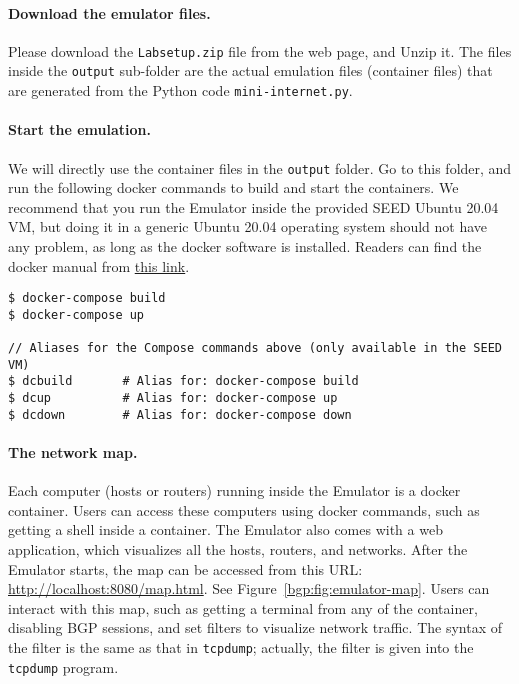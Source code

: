 \paragraph{Download the emulator files.}
Please download the \texttt{Labsetup.zip} file from the web page, and 
Unzip it. The files inside the \texttt{output} sub-folder are the actual
emulation files (container files) that are
generated from the Python code \texttt{mini-internet.py}.


\paragraph{Start the emulation.}
We will directly use the container files in the \texttt{output} folder. 
Go to this folder, and run the following docker commands
to build and start the containers. We recommend that you run the Emulator inside
the provided SEED Ubuntu 20.04 VM, but doing it in a generic Ubuntu 20.04 operating system
should not have any problem, as long as the docker software is installed. 
Readers can find the docker manual from 
\href{https://github.com/seed-labs/seed-labs/blob/master/manuals/docker/SEEDManual-Container.md}
{\underline{this link}}.

\begin{lstlisting}
$ docker-compose build
$ docker-compose up

// Aliases for the Compose commands above (only available in the SEED VM)
$ dcbuild       # Alias for: docker-compose build
$ dcup          # Alias for: docker-compose up
$ dcdown        # Alias for: docker-compose down
\end{lstlisting}

\paragraph{The network map.}
Each computer (hosts or routers) running inside the Emulator is a docker container.
Users can access these computers using docker commands, such as getting a shell
inside a container.
The Emulator also comes with a web application, which visualizes all the hosts, routers,
and networks.
After the Emulator starts, the map can be accessed from this
URL: \url{http://localhost:8080/map.html}.
See Figure~\ref{bgp:fig:emulator-map}.
Users can interact with this map, such as getting a terminal from any of the container,
disabling BGP sessions, and set filters to visualize network traffic.
The syntax of the filter is the same as that in \texttt{tcpdump}; actually,
the filter is given into the \texttt{tcpdump} program.

